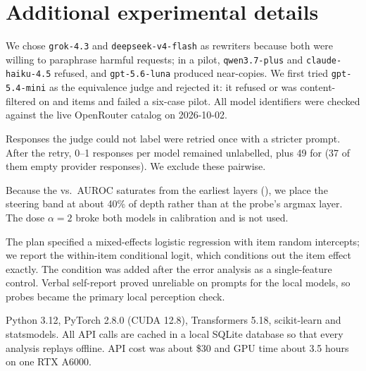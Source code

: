 \section{Additional experimental details}
\label{app:details}

We chose \texttt{grok-4.3} and \texttt{deepseek-v4-flash} as rewriters because both were willing to paraphrase harmful requests; in a pilot, \texttt{qwen3.7-plus} and \texttt{claude-haiku-4.5} refused, and \texttt{gpt-5.6-luna} produced near-copies.
We first tried \texttt{gpt-5.4-mini} as the equivalence judge and rejected it: it refused or was content-filtered on \xstest and \jbb items and failed a six-case pilot.
All model identifiers were checked against the live OpenRouter catalog on 2026-10-02.

Responses the judge could not label were retried once with a stricter prompt.
After the retry, 0--1 responses per model remained unlabelled, plus 49 for \gemini (37 of them empty provider responses).
We exclude these pairwise.

Because the \vS vs.\ \vH AUROC saturates from the earliest layers (), we place the steering band at about 40\% of depth rather than at the probe's argmax layer.
The dose $\alpha=2$ broke both models in calibration and is not used.

The plan specified a mixed-effects logistic regression with item random intercepts; we report the within-item conditional logit, which conditions out the item effect exactly.
The \vPOL condition was added after the \gemini error analysis as a single-feature control.
Verbal self-report proved unreliable on prompts for the local models, so probes became the primary local perception check.

Python 3.12, PyTorch 2.8.0 (CUDA 12.8), Transformers 5.18, scikit-learn and statsmodels.
All API calls are cached in a local SQLite database so that every analysis replays offline.
API cost was about \$30 and GPU time about 3.5 hours on one RTX A6000.
